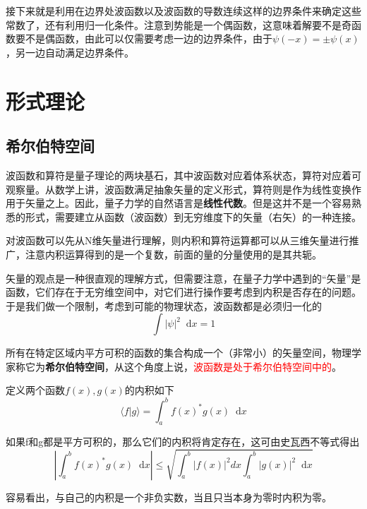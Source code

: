 \documentclass[UTF8]{ctexart}
\newcommand{\red}{\textcolor{red}}
\begin{document}
\noindent 接下来就是利用在边界处波函数以及波函数的导数连续这样的边界条件来确定这些常数了，还有利用归一化条件。注意到势能是一个偶函数，这意味着解要不是奇函数要不是偶函数，由此可以仅需要考虑一边的边界条件，由于$\psi(-x) = \pm \psi(x)$，另一边自动满足边界条件。

    \section{形式理论}
    \subsection{希尔伯特空间}
    波函数和算符是量子理论的两块基石，其中波函数对应着体系状态，算符对应着可观察量。从数学上讲，波函数满足抽象矢量的定义形式，算符则是作为线性变换作用于矢量之上。因此，量子力学的自然语言是\textbf{线性代数}。但是这并不是一个容易熟悉的形式，需要建立从函数（波函数）到无穷维度下的矢量（右矢）的一种连接。

    对波函数可以先从N维矢量进行理解，则内积和算符运算都可以从三维矢量进行推广，注意内积运算得到的是一个复数，前面的量的分量使用的是其共轭。

    矢量的观点是一种很直观的理解方式，但需要注意，在量子力学中遇到的“矢量”是函数，它们存在于无穷维空间中，对它们进行操作要考虑到内积是否存在的问题。于是我们做一个限制，考虑到可能的物理状态，波函数都是必须归一化的
    \begin{equation}
        \int |\psi|^2 \mathop{}\!\mathrm{d} x =1 
    \end{equation}

\noindent 所有在特定区域内平方可积的函数的集合构成一个（非常小）的矢量空间，物理学家称它为\textbf{希尔伯特空间}，从这个角度上说，\red{波函数是处于希尔伯特空间中的}。

    定义两个函数$f(x),g(x)$的内积如下
    \begin{equation}
        \langle f | g \rangle = \int_{a}^{b} f(x)^* g(x) \mathop{}\!\mathrm{d} x
    \end{equation}

\noindent 如果f和g都是平方可积的，那么它们的内积将肯定存在，这可由史瓦西不等式得出
\begin{equation}
    \left|\int_{a}^{b} f(x)^{*} g(x) \mathop{}\!\mathrm{d}  x\right| \leq \sqrt{\int_{a}^{b}|f(x)|^{2} d x \int_{a}^{b}|g(x)|^{2} \mathop{}\!\mathrm{d}  x}
    \end{equation}

\noindent 容易看出，与自己的内积是一个非负实数，当且只当本身为零时内积为零。
\end{document}
